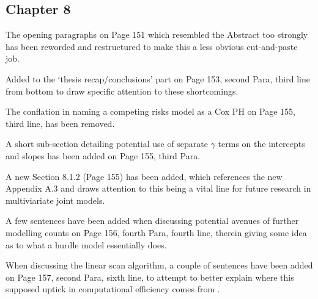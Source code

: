 \documentclass{article}
\begin{document}
\subsection*{Chapter 8}
The opening paragraphs on Page 151 which resembled the Abstract too strongly has been reworded and restructured to make this a less obvious cut-and-paste job.

Added  to the `thesis recap/conclusions' part on Page 153, second Para, third line from bottom to draw specific attention to these shortcomings.

The conflation in naming a competing risks model as a Cox PH on Page 155, third line, has been removed.

A short sub-section detailing potential use of separate $\gamma$ terms on the intercepts and slopes  has been added on Page 155, third Para.

A new Section 8.1.2  (Page 155) has been added, which references the new Appendix A.3 and draws attention to this being a vital line for future research in multiviariate joint models.

A few sentences have been added when discussing potential avenues of further modelling counts  on Page 156, fourth Para, fourth line, therein giving some idea as to what a hurdle model essentially does.

When discussing the linear scan algorithm, a couple of sentences have been added on Page 157, second Para, sixth line, to attempt to better explain where this supposed uptick in computational efficiency comes from  .
\end{document}

